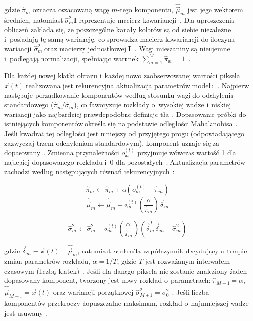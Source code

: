 gdzie $\hat{\pi}_m$ oznacza oszacowaną wagę $m$-tego komponentu, $\hat{\vec{\mu}}_m$ jest jego
wektorem średnich, natomiast $\hat{\sigma}_m^2 \mathbf{I}$ reprezentuje macierz
kowariancji~\cite{stauffer1999, zivkovic2004}. Dla uproszczenia obliczeń zakłada się, że
poszczególne kanały kolorów są od siebie niezależne i~posiadają tę samą wariancję, co sprowadza
macierz kowariancji do iloczynu wariancji $\hat{\sigma}_m^2$ oraz macierzy jednostkowej
$\mathbf{I}$~\cite{stauffer1999, zivkovic2004}. Wagi mieszaniny są nieujemne i~podlegają
normalizacji, spełniając warunek $\sum_{m=1}^{M} \hat{\pi}_m = 1$~\cite{stauffer1999,
  zivkovic2004}.

Dla każdej nowej klatki obrazu i~każdej nowo zaobserwowanej wartości piksela $\vec{x}(t)$
realizowana jest rekurencyjna aktualizacja parametrów modelu~\cite{stauffer1999, zivkovic2004}.
Najpierw następuje porządkowanie komponentów według stosunku wagi do odchylenia standardowego
($\hat{\pi}_m / \hat{\sigma}_m$), co faworyzuje rozkłady o~wysokiej wadze i~niskiej wariancji jako
najbardziej prawdopodobne definicje tła~\cite{stauffer1999}. Dopasowanie próbki do istniejących
komponentów określa się na podstawie odległości Mahalanobisa~\cite{stauffer1999, zivkovic2004}.
Jeśli kwadrat tej odległości jest mniejszy od przyjętego progu (odpowiadającego zazwyczaj trzem
odchyleniom standardowym), komponent uznaje się za dopasowany~\cite{stauffer1999}. Zmienna
przynależności $o_m^{(t)}$ przyjmuje wówczas wartość 1 dla najlepiej dopasowanego rozkładu i~0 dla
pozostałych~\cite{stauffer1999}. Aktualizacja parametrów zachodzi według następujących równań
rekurencyjnych~\cite{stauffer1999, zivkovic2004}:

\begin{equation}
  \hat{\pi}_m \leftarrow \hat{\pi}_m + \alpha (o_m^{(t)} - \hat{\pi}_m)
  \label{eq:mog2_weight_update}
\end{equation}
\begin{equation}
  \hat{\vec{\mu}}_m \leftarrow \hat{\vec{\mu}}_m + o_m^{(t)} \left( \frac{\alpha}{\hat{\pi}_m} \right) \vec{\delta}_m
  \label{eq:mog2_mean_update}
\end{equation}

\begin{equation}
  \hat{\sigma}^2_m \leftarrow \hat{\sigma}^2_m + o_m^{(t)} \left( \frac{\alpha}{\hat{\pi}_m} \right) \left( \vec{\delta}_m^T \vec{\delta}_m - \hat{\sigma}^2_m \right)
  \label{eq:mog2_var_update}
\end{equation}

gdzie $\vec{\delta}_m = \vec{x}(t) - \hat{\vec{\mu}}_m$, natomiast $\alpha$ określa współczynnik
decydujący o tempie zmian parametrów rozkładu, $\alpha = 1/T$, gdzie $T$ jest rozważanym interwałem
czasowym (liczbą klatek)~\cite{stauffer1999, zivkovic2006}. Jeśli dla danego piksela nie zostanie
znaleziony żaden dopasowany komponent, tworzony jest nowy rozkład o~parametrach: $\hat{\pi}_{M+1} =
  \alpha$, $\hat{\vec{\mu}}_{M+1} = \vec{x}(t)$ oraz wariancji początkowej $\hat{\sigma}_{M+1}^2 =
  \sigma_0^2$~\cite{stauffer1999}. Jeśli liczba komponentów przekroczy dopuszczalne maksimum, rozkład
o~najmniejszej wadze jest usuwany~\cite{stauffer1999}.


